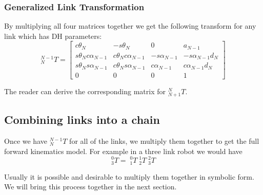 \subsubsection{Generalized Link Transformation}
By multiplying all four matrices together we get the following transform for any link which has DH parameters:
\begin{equation}\label{DHLinkTransform}
^{N-1}_NT = \left [
  \begin{array}{cccc}
  c\theta_N	          & -s\theta_N	             &     0         &   a_{N-1}	\\
  s\theta_Nc\alpha_{N-1}  &  c\theta_Nc\alpha_{N-1}  & -s\alpha_{N-1}  & -s\alpha_{N-1}d_N  \\
  s\theta_Ns\alpha_{N-1}  & c\theta_Ns\alpha_{N-1}   & c\alpha_{N-1}   & c\alpha_{N-1}d_N  \\
   0 & 0 & 0 & 1
  \end{array}
\right ]
\end{equation}

The reader can derive the corresponding matrix for $^{N}_{N+1}T$.


\subsection{Combining links into a chain}

Once we have $^{N-1}_NT$ for all of the links, we multiply them together to get the full forward kinematics model. For example in a three link robot we would have
\[
^0_3T = \;^0_1T \;^1_2T \;^2_3T
\]

Usually it is possible and desirable to multiply them together in symbolic form.    We will bring this process together in the next section.

